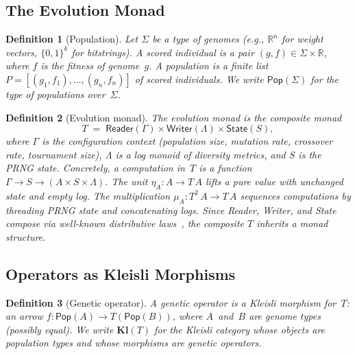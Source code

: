 \documentclass[submission,copyright,creativecommons]{eptcs}
\newtheorem{definition}{Definition}
\begin{document}
\subsection{The Evolution Monad}
\label{sec:monad}

\begin{definition}[Population]
Let $\Sigma$ be a type of \emph{genomes} (e.g., $\mathbb{R}^n$ for
weight vectors, $\{0,1\}^k$ for bitstrings). A \emph{scored individual}
is a pair $(g, f) \in \Sigma \times \mathbb{R}$, where $f$ is the
fitness of genome~$g$. A \emph{population} is a finite list
$P = [(g_1, f_1), \ldots, (g_n, f_n)]$ of scored individuals.
We write $\mathsf{Pop}(\Sigma)$ for the type of populations over~$\Sigma$.
\end{definition}

\begin{definition}[Evolution monad]
\label{def:evo-monad}
The \emph{evolution monad} is the composite monad
\[
  T \;=\; \mathsf{Reader}(\Gamma) \times \mathsf{Writer}(\Lambda) \times \mathsf{State}(S),
\]
where $\Gamma$ is the configuration context (population size,
mutation rate, crossover rate, tournament size), $\Lambda$ is a log
monoid of diversity metrics, and $S$ is the PRNG state.
Concretely, a computation in~$T$ is a function
$\Gamma \to S \to (A \times S \times \Lambda)$.
The unit $\eta_A : A \to T\,A$ lifts a pure value with unchanged
state and empty log. The multiplication
$\mu_A : T^2\,A \to T\,A$ sequences computations by threading
PRNG state and concatenating logs.
Since Reader, Writer, and State compose via well-known distributive
laws~\cite{moggi1991notions}, the composite $T$ inherits a monad
structure.
\end{definition}

\subsection{Operators as Kleisli Morphisms}
\label{sec:kleisli-ops}

\begin{definition}[Genetic operator]
A \emph{genetic operator} is a Kleisli morphism for~$T$:
an arrow $f : \mathsf{Pop}(A) \to T(\mathsf{Pop}(B))$, where $A$~and~$B$
are genome types (possibly equal). We write $\mathbf{Kl}(T)$ for the
Kleisli category whose objects are population types and whose morphisms
are genetic operators.
\end{definition}
\end{document}
